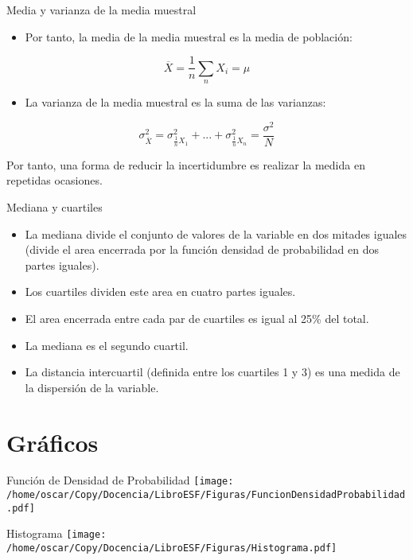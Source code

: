 \documentclass[xcolor={usenames,svgnames,dvipsnames}]{beamer}
\begin{document}
\begin{frame}[label=sec-1-8]{Media y varianza de la media muestral}
\begin{itemize}
\item Por tanto, la \alert{media de la media muestral} es la media de población:
\end{itemize}
\[
\overline{X}=\frac{1}{n}\sum_{n}X_{i} = \mu
\]

\begin{itemize}
\item La \alert{varianza de la media muestral} es la suma de las varianzas:
\end{itemize}

\[
\sigma_{\overline{X}}^{2}=\sigma_{\frac{1}{n}X_{1}}^{2}+...+\sigma_{\frac{1}{n}X_{n}}^{2}=\frac{\sigma^2}{N}
\]

Por tanto, una forma de \alert{reducir la incertidumbre} es realizar la
\alert{medida en repetidas ocasiones}.
\end{frame}


\begin{frame}[label=sec-1-9]{Mediana y cuartiles}
\begin{itemize}
\item La \alert{mediana} divide el conjunto de valores de la variable en \alert{dos
mitades} iguales (divide el area encerrada por la función densidad
de probabilidad en dos partes iguales).
\item Los \alert{cuartiles} dividen este area en \alert{cuatro} partes iguales.
\item El area encerrada entre cada par de cuartiles es igual al 25\% del total.
\item La \alert{mediana} es el \alert{segundo cuartil}.
\item La \alert{distancia intercuartil} (definida entre los cuartiles 1 y 3) es
una \alert{medida de la dispersión} de la variable.
\end{itemize}
\end{frame}

\section{Gráficos}
\label{sec-2}


\begin{frame}[label=sec-2-1]{Función de Densidad de Probabilidad}
\texttt{[image: /home/oscar/Copy/Docencia/LibroESF/Figuras/FuncionDensidadProbabilidad.pdf]}
\end{frame}
\begin{frame}[label=sec-2-2]{Histograma}
\texttt{[image: /home/oscar/Copy/Docencia/LibroESF/Figuras/Histograma.pdf]}
\end{frame}
\end{document}
